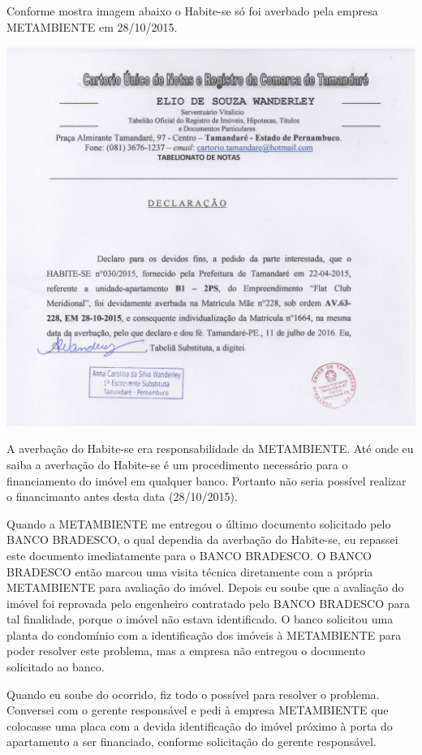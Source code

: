\documentclass[11pt]{letter}
\begin{document}
Conforme mostra imagem abaixo o Habite-se só foi averbado pela empresa METAMBIENTE em 28/10/2015.

\includegraphics[width=\textwidth]{doc.png}

A averbação do Habite-se era responsabilidade da METAMBIENTE. Até onde eu saiba a averbação do Habite-se é um procedimento necessário para o financiamento do imóvel em qualquer banco. Portanto não seria possível realizar o financimanto antes desta data (28/10/2015).

Quando a METAMBIENTE me entregou o último documento solicitado pelo BANCO BRADESCO, o qual dependia da averbação do Habite-se, eu repassei este documento imediatamente para o BANCO BRADESCO. O BANCO BRADESCO então marcou uma visita técnica diretamente com a própria METAMBIENTE para avaliação do imóvel. Depois eu soube que a avaliação do imóvel foi reprovada pelo engenheiro contratado pelo BANCO BRADESCO para tal finalidade, porque o imóvel não estava identificado. O banco solicitou uma planta do condomínio com a identificação dos imóveis à METAMBIENTE para poder resolver este problema, mas a empresa não entregou o documento solicitado ao banco. 

Quando eu soube do ocorrido, fiz todo o possível para resolver o problema. Conversei com o gerente responsável e pedi à empresa METAMBIENTE que colocasse uma placa com a devida identificação do imóvel próximo à porta do apartamento a ser financiado, conforme solicitação do gerente responsável. 
\end{document}
